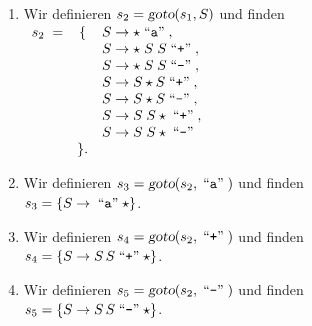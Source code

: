 \documentclass{article}
\newcommand{\quoted}[1]{\;\mbox{``\texttt{#1}''}\;}
\begin{document}
\begin{enumerate}
\begin{enumerate}
      \item Wir definieren $s_2 = \textsl{goto}(s_1, S)$ und finden
            \\[0.2cm]
            \hspace*{1.3cm}
            $
            \begin{array}[t]{lcl}
            s_2 \;= & \{ & S \rightarrow \star \quoted{a},          \\
                    &    & S \rightarrow \star\; S\; S \quoted{+},  \\
                    &    & S \rightarrow \star\; S\; S \quoted{-},  \\
                    &    & S \rightarrow S \star S \quoted{+},    \\
                    &    & S \rightarrow S \star S \quoted{-},    \\
                    &    & S \rightarrow S\; S \star \quoted{+},  \\
                    &    & S \rightarrow S\; S \star \quoted{-}   \\
                    & \}.
            \end{array}
            $
      \item Wir definieren $s_3 = \textsl{goto}(s_2, \quoted{a})$ und finden
            \\[0.2cm]
            \hspace*{1.3cm}
            $s_3 = \{ S \rightarrow \quoted{a} \star \}$.
      \item Wir definieren $s_4 = \textsl{goto}(s_2, \quoted{+})$ und finden
            \\[0.2cm]
            \hspace*{1.3cm}
            $s_4 = \{ S \rightarrow S\, S \quoted{+} \star \}$.
      \item Wir definieren $s_5 = \textsl{goto}(s_2, \quoted{-})$ und finden
            \\[0.2cm]
            \hspace*{1.3cm}
            $s_5 = \{ S \rightarrow S \, S \quoted{-} \star \}$.
      \end{enumerate}
      \pagebreak


\end{enumerate}
\end{document}

